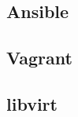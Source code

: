 \documentclass[../../deliverable-two.tex]{subfiles}
\begin{document}
\subsection{Ansible}

\subsection{Vagrant}

\subsection{libvirt}
\end{document}
